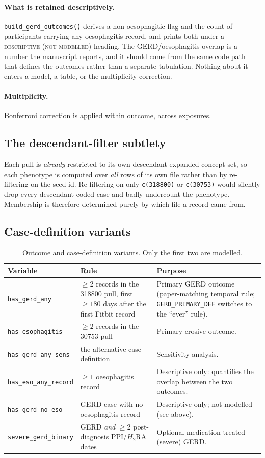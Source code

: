 \documentclass[11pt]{article}
\newcommand{\code}[1]{\texttt{\small #1}}
\begin{document}
\paragraph{What is retained descriptively.} \code{build\_gerd\_outcomes()}
derives a non-oesophagitic flag and the count of participants carrying any
oesophagitis record, and prints both under a \textsc{descriptive (not modelled)}
heading. The GERD/oesophagitis overlap is a number the manuscript reports, and
it should come from the same code path that defines the outcomes rather than a
separate tabulation. Nothing about it enters a model, a table, or the
multiplicity correction.

\paragraph{Multiplicity.} Bonferroni correction is applied within outcome,
across exposures.

\subsection{The descendant-filter subtlety}
\label{sec:subtlety}
Each pull is \emph{already} restricted to its own descendant-expanded concept
set, so each phenotype is computed over \emph{all} rows of its own file rather
than by re-filtering on the seed id. Re-filtering on only \code{c(318800)} or
\code{c(30753)} would silently drop every descendant-coded case and badly
undercount the phenotype. Membership is therefore determined purely by which
file a record came from.

\subsection{Case-definition variants}
\begin{table}[h]
\centering
\begin{tabular}{@{}p{3.6cm}p{3.9cm}p{5.6cm}@{}}
\toprule
\textbf{Variable} & \textbf{Rule} & \textbf{Purpose} \\
\midrule
\code{has_gerd_any} & $\geq 2$ records in the 318800 pull, first $\geq 180$ days after the first Fitbit record & Primary GERD outcome (paper-matching temporal rule; \code{GERD_PRIMARY_DEF} switches to the ``ever'' rule). \\
\code{has_esophagitis} & $\geq 2$ records in the 30753 pull & Primary erosive outcome. \\
\code{has_gerd_any_sens} & the alternative case definition & Sensitivity analysis. \\
\code{has_eso_any_record} & $\geq 1$ oesophagitis record & Descriptive only: quantifies the overlap between the two outcomes. \\
\code{has_gerd_no_eso} & GERD case with no oesophagitis record & Descriptive only; not modelled (see above). \\
\code{severe_gerd_binary} & GERD \emph{and} $\geq 2$ post-diagnosis PPI/$H_2$RA dates & Optional medication-treated (severe) GERD. \\
\bottomrule
\end{tabular}
\caption{Outcome and case-definition variants. Only the first two are modelled.}
\end{table}
\end{document}
